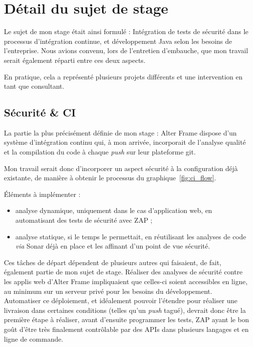 \section{Détail du sujet de stage}
\label{sec:sujet}
Le sujet de mon stage était ainsi formulé : \og Intégration de tests de sécurité dans le processus d'intégration continue, et développement Java selon les besoins de l'entreprise. \fg Nous avions convenu, lors de l'entretien d'embauche, que mon travail serait également réparti entre ces deux aspects.

En pratique, cela a représenté plusieurs projets différents et une intervention en tant que consultant.

\subsection{Sécurité \& CI}
La partie la plus précisément définie de mon stage : Alter Frame dispose d'un système d'intégration continu qui, à mon arrivée, incorporait de l'analyse qualité et la compilation du code à chaque \textit{push} sur leur plateforme git.

Mon travail serait donc d'incorporer un aspect sécurité à la configuration déjà existante, de manière à obtenir le processus du graphique~\ref{fig:ci_flow}.

Éléments à implémenter :
\begin{itemize}
	\item analyse dynamique, uniquement dans le cas d'application web, en automatisant des tests de sécurité avec ZAP ;
	\item analyse statique, si le temps le permettait, en réutilisant les analyses de code \textit{via} Sonar déjà en place et les affinant d'un point de vue sécurité.
\end{itemize}
Ces tâches de départ dépendent de plusieurs autres qui faisaient, de fait, également partie de mon sujet de stage. Réaliser des analyses de sécurité contre les applis web d'Alter Frame impliquaient que celles-ci soient accessibles en ligne, au minimum sur un serveur privé pour les besoins du développement. Automatiser ce déploiement, et idéalement pouvoir l'étendre pour réaliser une livraison dans certaines conditions (telles qu'un \textit{push} tagué), devrait donc être la première étape à réaliser, avant d'ensuite programmer les tests, ZAP ayant le bon goût d'être très finalement contrôlable par des APIs dans plusieurs langages\cite{zap_api} et en ligne de commande\cite{zap_cli}\cite{zap_cli_wrapper}.

